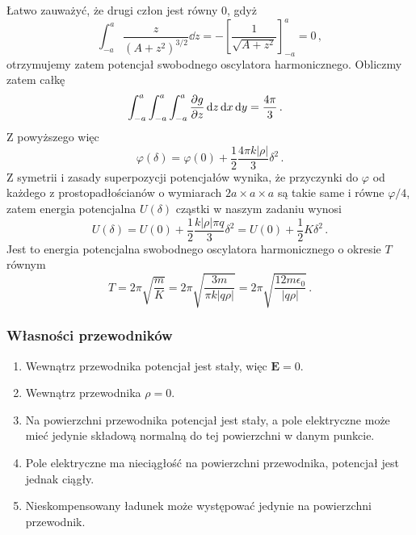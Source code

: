 \documentclass[../main.tex]{subfiles}
\begin{document}
Łatwo zauważyć, że drugi człon jest równy 0, gdyż
\begin{equation*}
    \int_{-a}^a\frac{z}{(A+z^2)^{3/2}}\dd{z}=-\left[\frac{1}{\sqrt{A+z^2}}\right]_{-a}^a=0\,,
\end{equation*}
otrzymujemy zatem potencjał swobodnego oscylatora harmonicznego. Obliczmy zatem całkę
\begin{equation*}
\begin{split}
    &\int_{-a}^a\int_{-a}^a\int_{-a}^a\pdv{g}{z}\dd{z}\dd{x}\dd{y}=\frac{4\pi}{3}\,.
\end{split}
\end{equation*}
Z powyższego więc
\begin{equation*}
    \varphi(\delta)=\varphi(0)+\frac{1}{2}\frac{4\pi k|\rho|}{3}\delta^2\,.
\end{equation*}
Z symetrii i zasady superpozycji potencjałów wynika, że przyczynki do \(\varphi\) od każdego z prostopadłościanów o wymiarach \(2a\times a \times a\) są takie same i równe \(\varphi/4\), zatem energia potencjalna \(U(\delta)\) cząstki w naszym zadaniu wynosi
\begin{equation*}
    U(\delta)=U(0)+\frac{1}{2}\frac{k|\rho|\pi q}{3}\delta ^2=U(0)+\frac{1}{2}K \delta^2\,.
\end{equation*}
Jest to energia potencjalna swobodnego oscylatora harmonicznego o okresie \(T\) równym
\begin{equation*}
    T=2\pi\sqrt{\frac{m}{K}}=2\pi\sqrt{\frac{3m}{\pi k |q\rho| }}=2\pi\sqrt{\frac{12m\epsilon_0}{|q\rho| }}\,.
\end{equation*}
\subsubsection{Własności przewodników}
\begin{enumerate}
    \item Wewnątrz przewodnika potencjał jest stały, więc \(\mathbf{E}=0\).
    \item Wewnątrz przewodnika \(\rho=0\).
    \item Na powierzchni przewodnika potencjał jest stały, a pole elektryczne może mieć jedynie składową normalną do tej powierzchni w danym punkcie.
    \item Pole elektryczne ma nieciągłość na powierzchni przewodnika, potencjał jest jednak ciągły.
    \item Nieskompensowany ładunek może występować jedynie na powierzchni przewodnik.
\end{enumerate}
\end{document}
